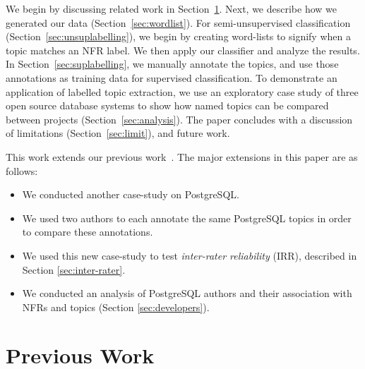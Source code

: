 \documentclass[smallextended]{svjour3}       %
\begin{document}
We begin by discussing related work in Section~\ref{sec:related}.
Next, we describe how we generated our data (Section~\ref{sec:wordlist}). For semi-unsupervised classification (Section~\ref{sec:unsuplabelling}), we
begin by creating word-lists to signify when a topic matches an NFR label. We then apply our classifier and analyze the results. 
In Section~\ref{sec:suplabelling}, we manually annotate the topics, and use those annotations as training data for supervised classification.  
To demonstrate an application of labelled topic extraction, we use an exploratory case study of three open source database systems to show how named
topics can be compared between projects  (Section~\ref{sec:analysis}). 
The paper concludes with a discussion of limitations (Section~\ref{sec:limit}), and future work.

This work extends our previous work~\cite{msr2011}. The major extensions in this paper are as follows:
\begin{itemize}
	\item We conducted another case-study on PostgreSQL. 
	\item We used two authors to each annotate the same PostgreSQL topics in order to compare
these annotations. 
	\item We used this new case-study to test \emph{inter-rater
          reliability} (IRR), described in Section \ref{sec:inter-rater}. 
	\item We conducted an analysis of PostgreSQL authors and their association with NFRs and
topics (Section \ref{sec:developers}).
\end{itemize}

\section{Previous Work}
\label{sec:related}
\end{document}
